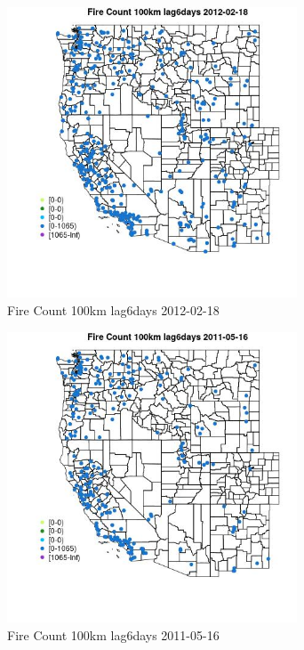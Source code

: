 \begin{figure} 
\centering  
\includegraphics[width=0.77\textwidth]{Code_Outputs/Report_ML_input_PM25_Step4_part_f_de_duplicated_aveswNAs_MapObsFire_Count_100km_lag6days2012-02-18.jpg} 
\caption{\label{fig:Report_ML_input_PM25_Step4_part_f_de_duplicated_aveswNAsMapObsFire_Count_100km_lag6days2012-02-18}Fire Count 100km lag6days 2012-02-18} 
\end{figure} 
 

\begin{figure} 
\centering  
\includegraphics[width=0.77\textwidth]{Code_Outputs/Report_ML_input_PM25_Step4_part_f_de_duplicated_aveswNAs_MapObsFire_Count_100km_lag6days2011-05-16.jpg} 
\caption{\label{fig:Report_ML_input_PM25_Step4_part_f_de_duplicated_aveswNAsMapObsFire_Count_100km_lag6days2011-05-16}Fire Count 100km lag6days 2011-05-16} 
\end{figure} 
 

